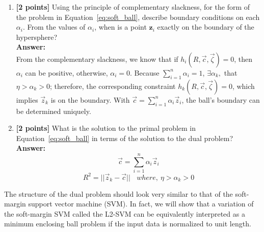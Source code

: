 \documentclass{article}
\begin{document}
\begin{enumerate}[resume]
\item \textbf{[2 points]} Using the principle of complementary slackness, for the form of the problem in Equation~\ref{eq:soft_ball}, describe boundary conditions on each $\alpha_i$. From the values of $\alpha_i$, when is a point $\boldsymbol{z}_i$ exactly on the boundary of the hypersphere?\\
\textbf{Answer:}\\

From the complementary slackness, we know that if $h_i(R,\vec{c},\vec{\zeta})=0$, then $\alpha_i$ can be positive, otherwise, $\alpha_i=0$. Because $\sum_{i=1}^n\alpha_i=1$, $\exists \alpha_k,$ that $\eta>\alpha_k>0$; therefore, the corresponding constraint $h_k(R,\vec{c},\vec{\zeta})=0$, which implies $\vec{z}_k$ is on the boundary. With $\vec{c}=\sum_{i=1}^n\alpha_i\vec{z}_i$, the ball's boundary can be determined uniquely.

\item \textbf{[2 points]} What is the solution to the primal problem in Equation~\ref{eq:soft_ball} in terms of the solution to the dual problem?\\
\textbf{Answer:}\\
$$\vec{c}=\sum_{i=1}^n\alpha_i\vec{z}_i$$
$$R^2=||\vec{z}_k-\vec{c}||~~~~where,~\eta>\alpha_k>0$$



\end{enumerate}

The structure of the dual problem should look very similar to that of the soft-margin support vector 
machine (SVM). In fact, we will show that a variation of the soft-margin SVM called the L2-SVM can be equivalently interpreted 
as a minimum enclosing ball problem if the input data is normalized to unit length.
\end{document}
